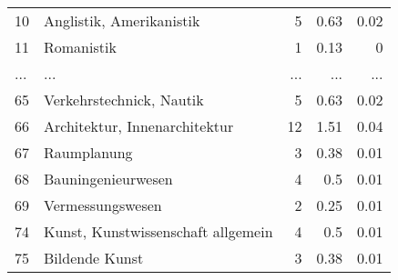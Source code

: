 \begin{longtable}{lXrrr}
        10 & \multicolumn{1}{X}{Anglistik, Amerikanistik} & %
          \num{5} &
          \num[round-mode=places,round-precision=2]{0,63} &
          \num[round-mode=places,round-precision=2]{0,02} \\
        11 & \multicolumn{1}{X}{Romanistik} & %
          \num{1} &
          \num[round-mode=places,round-precision=2]{0,13} &
          \num[round-mode=places,round-precision=2]{0} \\
       ... & ... & ... & ... & ... \\
        65 & \multicolumn{1}{X}{Verkehrstechnick, Nautik} & %
          \num{5} &
          \num[round-mode=places,round-precision=2]{0,63} &
          \num[round-mode=places,round-precision=2]{0,02} \\

        66 & \multicolumn{1}{X}{Architektur, Innenarchitektur} & %
          \num{12} &
          \num[round-mode=places,round-precision=2]{1,51} &
          \num[round-mode=places,round-precision=2]{0,04} \\

        67 & \multicolumn{1}{X}{Raumplanung} & %
          \num{3} &
          \num[round-mode=places,round-precision=2]{0,38} &
          \num[round-mode=places,round-precision=2]{0,01} \\

        68 & \multicolumn{1}{X}{Bauningenieurwesen} & %
          \num{4} &
          \num[round-mode=places,round-precision=2]{0,5} &
          \num[round-mode=places,round-precision=2]{0,01} \\

        69 & \multicolumn{1}{X}{Vermessungswesen} & %
          \num{2} &
          \num[round-mode=places,round-precision=2]{0,25} &
          \num[round-mode=places,round-precision=2]{0,01} \\

        74 & \multicolumn{1}{X}{Kunst, Kunstwissenschaft allgemein} & %
          \num{4} &
          \num[round-mode=places,round-precision=2]{0,5} &
          \num[round-mode=places,round-precision=2]{0,01} \\

        75 & \multicolumn{1}{X}{Bildende Kunst} & %
          \num{3} &
          \num[round-mode=places,round-precision=2]{0,38} &
          \num[round-mode=places,round-precision=2]{0,01} \\


\end{longtable}
